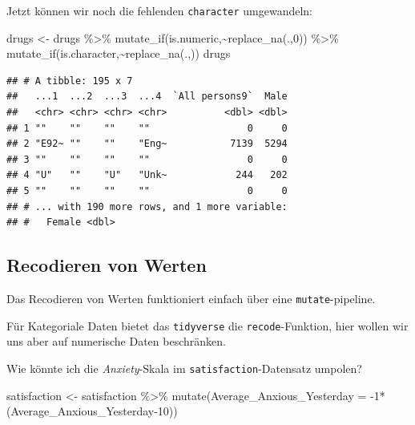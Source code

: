\documentclass[
]{book}
\newenvironment{Shaded}{\begin{snugshade}}{\end{snugshade}}
\newcommand{\AttributeTok}[1]{\textcolor[rgb]{0.77,0.63,0.00}{#1}}
\newcommand{\DecValTok}[1]{\textcolor[rgb]{0.00,0.00,0.81}{#1}}
\newcommand{\FunctionTok}[1]{\textcolor[rgb]{0.00,0.00,0.00}{#1}}
\newcommand{\NormalTok}[1]{#1}
\newcommand{\OtherTok}[1]{\textcolor[rgb]{0.56,0.35,0.01}{#1}}
\newcommand{\SpecialCharTok}[1]{\textcolor[rgb]{0.00,0.00,0.00}{#1}}
\newcommand{\StringTok}[1]{\textcolor[rgb]{0.31,0.60,0.02}{#1}}
\begin{document}
Jetzt können wir noch die fehlenden \texttt{character} umgewandeln:

\begin{Shaded}
\begin{Highlighting}[]
\NormalTok{drugs }\OtherTok{\textless{}{-}}\NormalTok{ drugs }\SpecialCharTok{\%\textgreater{}\%} 
  \FunctionTok{mutate\_if}\NormalTok{(is.numeric,}\SpecialCharTok{\textasciitilde{}}\FunctionTok{replace\_na}\NormalTok{(.,}\DecValTok{0}\NormalTok{)) }\SpecialCharTok{\%\textgreater{}\%} 
  \FunctionTok{mutate\_if}\NormalTok{(is.character,}\SpecialCharTok{\textasciitilde{}}\FunctionTok{replace\_na}\NormalTok{(.,}\StringTok{\textquotesingle{}\textquotesingle{}}\NormalTok{))}
\NormalTok{drugs}
\end{Highlighting}
\end{Shaded}

\begin{verbatim}
## # A tibble: 195 x 7
##   ...1  ...2  ...3  ...4  `All persons9`  Male
##   <chr> <chr> <chr> <chr>          <dbl> <dbl>
## 1 ""    ""    ""    ""                 0     0
## 2 "E92~ ""    ""    "Eng~           7139  5294
## 3 ""    ""    ""    ""                 0     0
## 4 "U"   ""    "U"   "Unk~            244   202
## 5 ""    ""    ""    ""                 0     0
## # ... with 190 more rows, and 1 more variable:
## #   Female <dbl>
\end{verbatim}

\hypertarget{recodieren-von-werten}{%
\subsection{Recodieren von Werten}\label{recodieren-von-werten}}

Das Recodieren von Werten funktioniert einfach über eine \texttt{mutate}-pipeline.

Für Kategoriale Daten bietet das \texttt{tidyverse} die \texttt{recode}-Funktion, hier wollen wir uns aber auf numerische Daten beschränken.

Wie könnte ich die \emph{Anxiety}-Skala im \texttt{satisfaction}-Datensatz umpolen?

\begin{Shaded}
\begin{Highlighting}[]
\NormalTok{satisfaction }\OtherTok{\textless{}{-}}\NormalTok{ satisfaction }\SpecialCharTok{\%\textgreater{}\%} 
  \FunctionTok{mutate}\NormalTok{(}\AttributeTok{Average\_Anxious\_Yesterday =} \SpecialCharTok{{-}}\DecValTok{1}\SpecialCharTok{*}\NormalTok{ (Average\_Anxious\_Yesterday}\DecValTok{{-}10}\NormalTok{))}
\end{Highlighting}
\end{Shaded}
\end{document}
